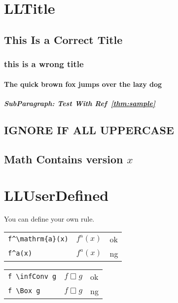\documentclass[a4paper]{article}
\newcommand{\tA}[1]{\textcolor{cA}{#1}}
\newcommand{\tD}[1]{\textcolor{cD}{#1}}
\DeclareMathOperator{\infConv}{\Box}
\begin{document}
\section{LLTitle}

\subsection{
	This Is a Correct Title
}

\subsubsection{this is a wrong title}

\paragraph{The quick brown fox jumps over the lazy dog}

\subparagraph{SubParagraph: Test With Ref~\ref{thm:sample}}

\subsection{IGNORE IF ALL UPPERCASE}

\subsection{Math Contains version $x$}

\section{LLUserDefined}

You can define your own rule.

\begin{table}[H]
	\centering
	\begin{tabular}{lll}
		\verb|f^\mathrm{a}(x)| & $f^{\mathrm{a}}(x)$ & \tA{ok} \\
		\verb|f^a(x)|          & $f^a(x)$            & \tD{ng} \\
	\end{tabular}
\end{table}

\begin{table}[H]
	\centering
	\begin{tabular}{lll}
		\verb|f \infConv g| & $f \infConv g$ & \tA{ok} \\
		\verb|f \Box g|     & $f \Box g$     & \tD{ng} \\
	\end{tabular}
\end{table}
\end{document}
